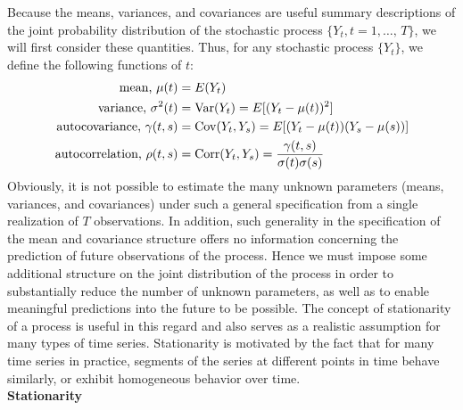 Because the means, variances, and covariances are useful summary descriptions of the joint probability distribution of the stochastic process $\{ Y_t, t=1, \ldots,  \, T\}$, we will first consider these quantities. Thus, for any stochastic process $\{Y_t\}$, we define the following functions of $t$:
	\begin{equation}\label{eqn:texteqn}
	\begin{split}
	\text{mean, }\mu(t)&=E(Y_t) \\
	\text{variance, }\sigma^2(t)&=\Var(Y_t)=E[(Y_t-\mu(t))^2] \\
	\text{autocovariance, }\gamma(t,s)&=\Cov(Y_t,Y_s)=E[(Y_t-\mu(t))(Y_s-\mu(s))] \\
	\text{autocorrelation, }\rho(t,s)&=\Corr(Y_t,Y_s)=\dfrac{\gamma(t,s)}{\sigma(t)\sigma(s)}
	\end{split}
	\end{equation}
 Obviously, it is not possible to estimate the many unknown parameters (means, variances, and covariances) under such a general specification from a single realization of $T$ observations. In addition, such generality in the specification of the mean and covariance structure offers no information concerning the prediction of future observations of the process. Hence we must impose some additional structure on the joint distribution of the process in order to substantially reduce the number of unknown parameters, as well as to enable meaningful predictions into the future to be possible. The concept of stationarity of a process is useful in this regard and also serves as a realistic assumption for many types of time series. Stationarity is motivated by the fact that for many time series in practice, segments of the series at different points in time behave similarly, or exhibit homogeneous behavior over time. \\


\noindent \textbf{Stationarity} \\


